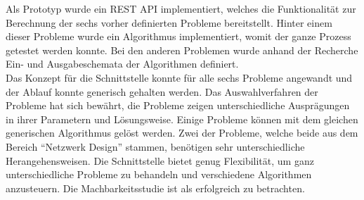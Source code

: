Als Prototyp wurde ein REST API implementiert, welches die Funktionalität zur Berechnung der sechs vorher definierten Probleme bereitstellt. Hinter einem dieser Probleme wurde ein 
Algorithmus implementiert, womit der ganze Prozess getestet werden konnte. Bei den anderen Problemen wurde anhand der Recherche Ein- und Ausgabeschemata der Algorithmen definiert.\\

Das Konzept für die Schnittstelle konnte für alle sechs Probleme angewandt und der Ablauf konnte generisch gehalten werden. Das Auswahlverfahren der Probleme hat sich bewährt, die Probleme 
zeigen unterschiedliche Ausprägungen in ihrer Parametern und Lösungsweise. Einige Probleme können mit dem gleichen generischen Algorithmus gelöst werden. Zwei der Probleme, welche 
beide aus dem Bereich "`Netzwerk Design"' stammen, benötigen sehr unterschiedliche Herangehensweisen. Die Schnittstelle bietet genug Flexibilität, um ganz unterschiedliche Probleme zu behandeln und 
verschiedene Algorithmen anzusteuern. Die Machbarkeitsstudie ist als erfolgreich zu betrachten.